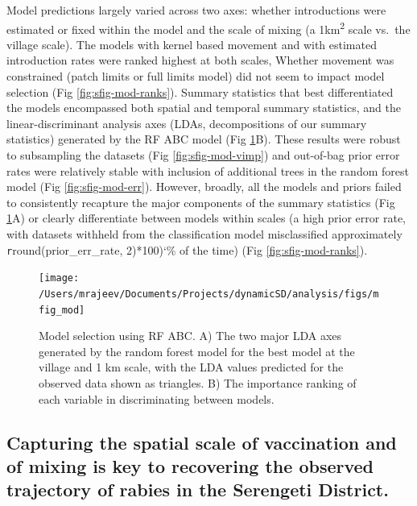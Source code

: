 \documentclass[
  oneside]{book}
\begin{document}
Model predictions largely varied across two axes: whether introductions were estimated or fixed within the model and the scale of mixing (a 1km\textsuperscript{2} scale vs.~the village scale). The models with kernel based movement and with estimated introduction rates were ranked highest at both scales, Whether movement was constrained (patch limits or full limits model) did not seem to impact model selection (Fig \ref{fig:sfig-mod-ranks}). Summary statistics that best differentiated the models encompassed both spatial and temporal summary statistics, and the linear-discriminant analysis axes (LDAs, decompositions of our summary statistics) generated by the RF ABC model (Fig \ref{fig:mfig-mods}B). These results were robust to subsampling the datasets (Fig \ref{fig:sfig-mod-vimp}) and out-of-bag prior error rates were relatively stable with inclusion of additional trees in the random forest model (Fig \ref{fig:sfig-mod-err}). However, broadly, all the models and priors failed to consistently recapture the major components of the summary statistics (Fig \ref{fig:mfig-mods}A) or clearly differentiate between models within scales (a high prior error rate, with datasets withheld from the classification model misclassified approximately \texttt{r}round(prior\_err\_rate, 2)*100)`\% of the time) (Fig \ref{fig:sfig-mod-ranks}).

\begin{figure}
\texttt{[image: /Users/mrajeev/Documents/Projects/dynamicSD/analysis/figs/mfig\_mod]} \caption[Model selection using RF ABC.]{Model selection using RF ABC. A) The two major LDA axes generated by the random forest model for the best model at the village and 1 km scale, with the LDA values predicted for the observed data shown as triangles. B) The importance ranking of each variable in discriminating between models.}\label{fig:mfig-mods}
\end{figure}



\hypertarget{capturing-the-spatial-scale-of-vaccination-and-of-mixing-is-key-to-recovering-the-observed-trajectory-of-rabies-in-the-serengeti-district.}{%
\subsection{Capturing the spatial scale of vaccination and of mixing is key to recovering the observed trajectory of rabies in the Serengeti District.}\label{capturing-the-spatial-scale-of-vaccination-and-of-mixing-is-key-to-recovering-the-observed-trajectory-of-rabies-in-the-serengeti-district.}}
\end{document}
